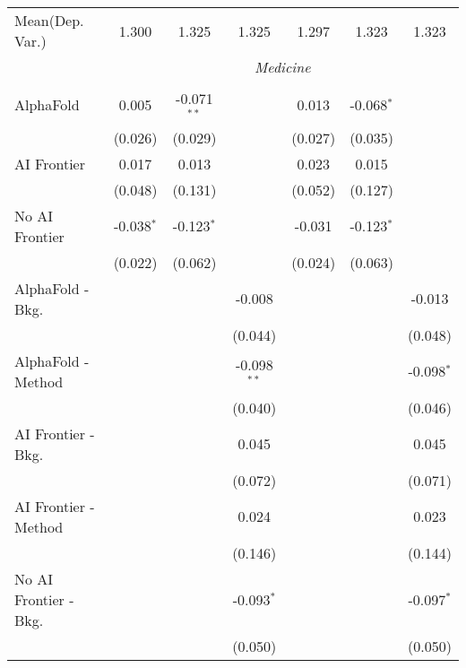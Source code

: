 \begin{tabular}{lcccccc}
Mean(Dep. Var.) & 1.300 & 1.325 & 1.325 & 1.297 & 1.323 & 1.323 \\
 & \multicolumn{6}{c}{\textit{Medicine}} \\ \\
   AlphaFold               & 0.005        & -0.071$^{**}$ &               & 0.013   & -0.068$^{*}$ &   \\   
                           & (0.026)      & (0.029)       &               & (0.027) & (0.035)      &   \\   
   AI Frontier             & 0.017        & 0.013         &               & 0.023   & 0.015        &   \\   
                           & (0.048)      & (0.131)       &               & (0.052) & (0.127)      &   \\   
   No AI Frontier          & -0.038$^{*}$ & -0.123$^{*}$  &               & -0.031  & -0.123$^{*}$ &   \\   
                           & (0.022)      & (0.062)       &               & (0.024) & (0.063)      &   \\   
   AlphaFold - Bkg.        &              &               & -0.008        &         &              & -0.013\\   
                           &              &               & (0.044)       &         &              & (0.048)\\   
   AlphaFold - Method      &              &               & -0.098$^{**}$ &         &              & -0.098$^{*}$\\   
                           &              &               & (0.040)       &         &              & (0.046)\\   
   AI Frontier - Bkg.      &              &               & 0.045         &         &              & 0.045\\   
                           &              &               & (0.072)       &         &              & (0.071)\\   
   AI Frontier - Method    &              &               & 0.024         &         &              & 0.023\\   
                           &              &               & (0.146)       &         &              & (0.144)\\   
   No AI Frontier - Bkg.   &              &               & -0.093$^{*}$  &         &              & -0.097$^{*}$\\   
                           &              &               & (0.050)       &         &              & (0.050)\\   

\end{tabular}
